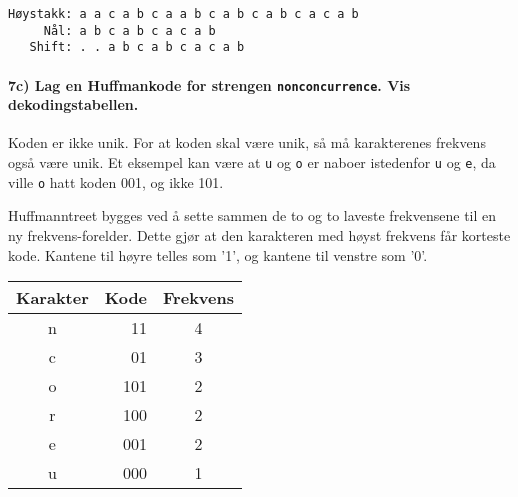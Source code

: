 \documentclass[11pt,a4paper]{article}
\theoremstyle{def}
\begin{document}
\begin{Verbatim}
Høystakk: a a c a b c a a b c a b c a b c a c a b
     Nål: a b c a b c a c a b
   Shift: . . a b c a b c a c a b
\end{Verbatim}

\newpage

\paragraph{7c) Lag en Huffmankode for strengen \texttt{nonconcurrence}. Vis dekodingstabellen.}
Koden er ikke unik. For at koden skal være unik, så må karakterenes frekvens også være unik. Et eksempel kan være at \texttt{u} og \texttt{o} er naboer istedenfor \texttt{u} og \texttt{e}, da ville \texttt{o} hatt koden 001, og ikke 101.

Huffmanntreet bygges ved å sette sammen de to og to laveste frekvensene til en ny frekvens-forelder. Dette gjør at den karakteren med høyst frekvens får korteste kode. Kantene til høyre telles som '1', og kantene til venstre som '0'.

\begin{minipage}{0.5\textwidth}
\begin{tabular}{crc}
Karakter&Kode&Frekvens\\
\hline
n&11&4\\
c&01&3\\
o&101&2\\
r&100&2\\
e&001&2\\
u&000&1\\
\end{tabular}
\end{minipage}
\begin{minipage}{0.5\textwidth}
\vspace{20pt}
\end{minipage}
\end{document}
